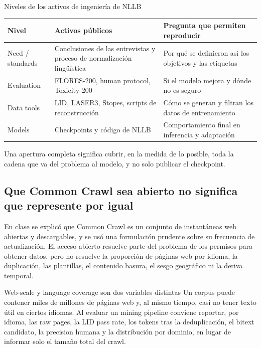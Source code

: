 \documentclass[a4paper]{article}
\begin{document}
\begin{importantbox}{Niveles de los activos de ingeniería de NLLB}
\begin{tabularx}{\textwidth}{@{}L{0.2\textwidth}L{0.29\textwidth}X@{}}
\toprule
Nivel & Activos públicos & Pregunta que permiten reproducir \\
\midrule
Need / standards & Conclusiones de las entrevistas y proceso de normalización lingüística & Por qué se definieron así los objetivos y las etiquetas \\
Evaluation & FLORES-200, human protocol, Toxicity-200 & Si el modelo mejora y dónde no es seguro \\
Data tools & LID, LASER3, Stopes, scripts de reconstrucción & Cómo se generan y filtran los datos de entrenamiento \\
Models & Checkpoints y código de NLLB & Comportamiento final en inferencia y adaptación \\
\bottomrule
\end{tabularx}
Una apertura completa significa cubrir, en la medida de lo posible, toda la cadena que va del problema al modelo, y no solo publicar el checkpoint.
\end{importantbox}


\subsection{Que Common Crawl sea abierto no significa que represente por igual}

En clase se explicó que Common Crawl es un conjunto de instantáneas web abiertas y descargables, y se usó una formulación prudente sobre su frecuencia de actualización. El acceso abierto resuelve parte del problema de los permisos para obtener datos, pero no resuelve la proporción de páginas web por idioma, la duplicación, las plantillas, el contenido basura, el sesgo geográfico ni la deriva temporal.

\begin{warningbox}{Web-scale y language coverage son dos variables distintas}
Un corpus puede contener miles de millones de páginas web y, al mismo tiempo, casi no tener texto útil en ciertos idiomas. Al evaluar un mining pipeline conviene reportar, por idioma, las raw pages, la LID pass rate, los tokens tras la deduplicación, el bitext candidato, la precision humana y la distribución por dominio, en lugar de informar solo el tamaño total del crawl.
\end{warningbox}
\end{document}
